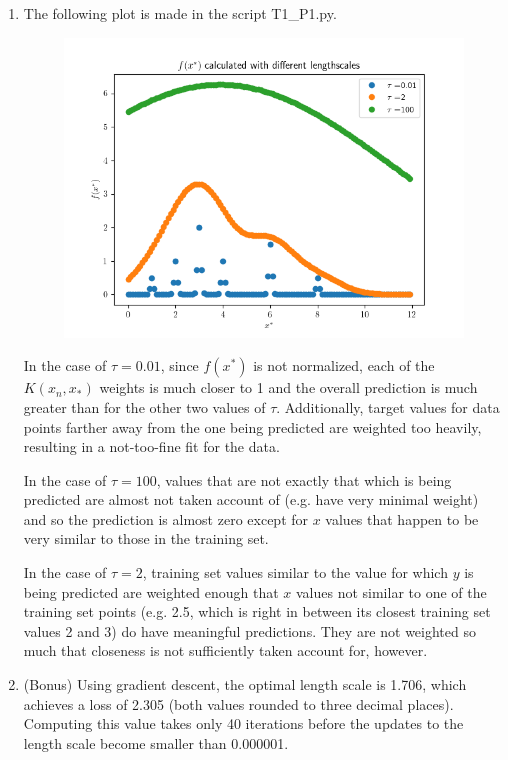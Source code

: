 \documentclass[submit]{harvardml}
\begin{document}
\begin{enumerate}
\newpage
\item 

The following plot is made in the script T1\_P1.py.

\begin{figure}[h]
\includegraphics[scale=0.8]{P1}
\centering
\end{figure}

In the case of $\tau=0.01$, since $f(x^*)$ is not normalized, each of the $K(x_n, x_*)$ weights
is much closer to 1 and the overall prediction is much greater than for the other two values of 
$\tau$. Additionally, target values for data points farther away from the one being 
predicted are weighted too heavily, resulting in a not-too-fine fit for the data.

In the case of $\tau=100$, values that are not exactly that which is being predicted are almost
not taken account of (e.g. have very minimal weight) and so the prediction is almost zero except 
for $x$ values that happen to be very similar to those in the training set.

In the case of $\tau=2$, training set values similar to the value for which $y$ is being predicted
are weighted enough that $x$ values not similar to one of the training set points (e.g.
2.5, which is right in between its closest training set values 2 and 3) do have meaningful
predictions. They are not weighted so much that closeness is not sufficiently taken account for,
however.

\item (Bonus) Using gradient descent, the optimal length scale is 1.706, which achieves a loss
of 2.305 (both values rounded to three decimal places). Computing this value takes only 40
iterations before the updates to the length scale become smaller than 0.000001.



\end{enumerate}
\end{document}
